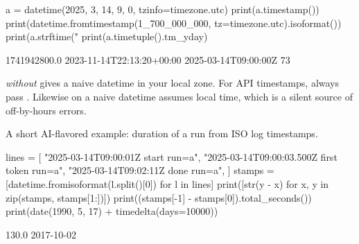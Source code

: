 \begin{center}
\end{center}

\begin{pycode}
a = datetime(2025, 3, 14, 9, 0, tzinfo=timezone.utc)
print(a.timestamp())
print(datetime.fromtimestamp(1_700_000_000, tz=timezone.utc).isoformat())
print(a.strftime("%
print(a.timetuple().tm_yday)
\end{pycode}
\begin{rawcode}
1741942800.0
2023-11-14T22:13:20+00:00
2025-03-14T09:00:00Z
73
\end{rawcode}

\begin{trap}
 \emph{without}  gives a naive datetime in your local
zone. For API timestamps, always pass . Likewise  on a naive
datetime assumes local time, which is a silent source of off-by-hours errors.
\end{trap}

A short AI-flavored example: duration of a run from ISO log timestamps.

\begin{pycode}
lines = [
    "2025-03-14T09:00:01Z start run=a",
    "2025-03-14T09:00:03.500Z first token run=a",
    "2025-03-14T09:02:11Z done run=a",
]
stamps = [datetime.fromisoformat(l.split()[0]) for l in lines]
print([str(y - x) for x, y in zip(stamps, stamps[1:])])
print((stamps[-1] - stamps[0]).total_seconds())
print(date(1990, 5, 17) + timedelta(days=10000))
\end{pycode}
\begin{rawcode}
['0:00:02.500000', '0:02:07.500000']
130.0
2017-10-02
\end{rawcode}

